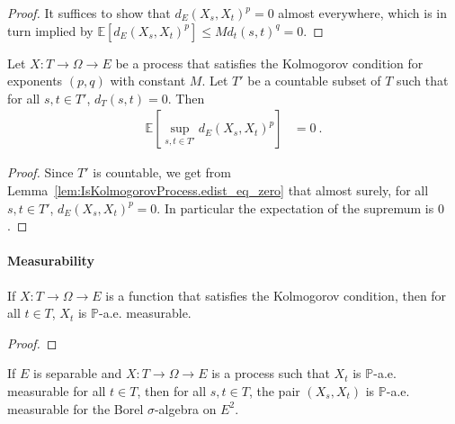 \begin{proof}\leanok
It suffices to show that $d_E(X_s, X_t)^p = 0$ almost everywhere, which is in turn implied by $\mathbb{E}[d_E(X_s, X_t)^p] \le M d_t(s, t)^q = 0$.
\end{proof}


\begin{lemma}\label{lem:IsKolmogorovProcess.lintegral_sup_rpow_edist_eq_zero}
  \leanok
Let $X : T \to \Omega \to E$ be a process that satisfies the Kolmogorov condition for exponents $(p,q)$ with constant $M$.
Let $T'$ be a countable subset of $T$ such that for all $s, t \in T'$, $d_T(s, t) = 0$.
Then
\begin{align*}
  \mathbb{E}\left[ \sup_{s, t \in T'} d_E(X_s, X_t)^p \right]
  &= 0
  \: .
\end{align*}
\end{lemma}

\begin{proof}\leanok
Since $T'$ is countable, we get from Lemma~\ref{lem:IsKolmogorovProcess.edist_eq_zero} that almost surely, for all $s, t \in T'$, $d_E(X_s, X_t)^p = 0$.
In particular the expectation of the supremum is $0$.
\end{proof}


\paragraph{Measurability}

\begin{lemma}\label{lem:IsKolmogorovProcess.aemeasurable}
  \mathlibok
If $X : T \to \Omega \to E$ is a function that satisfies the Kolmogorov condition, then for all $t \in T$, $X_t$ is $\mathbb{P}$-a.e. measurable.
\end{lemma}

\begin{proof}\leanok

\end{proof}


\begin{lemma}\label{lem:aemeasurable_pair_of_aemeasurable}
  \leanok
If $E$ is separable and $X : T \to \Omega \to E$ is a process such that $X_t$ is $\mathbb{P}$-a.e. measurable for all $t \in T$, then for all $s, t \in T$, the pair $(X_s, X_t)$ is $\mathbb{P}$-a.e. measurable for the Borel $\sigma$-algebra on $E^2$.
\end{lemma}

